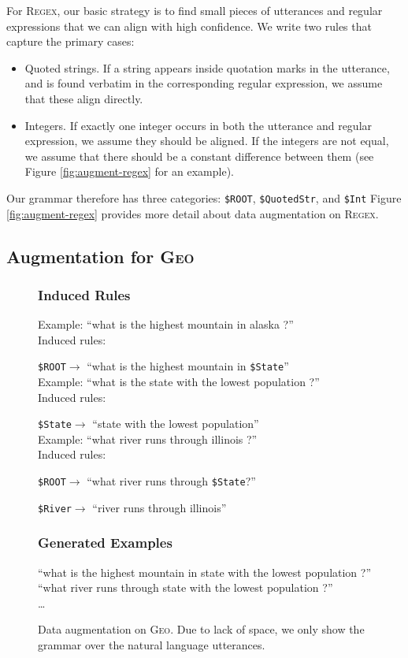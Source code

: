 \documentclass[11pt,letterpaper]{article}
\newcommand{\regex}{\textsc{Regex}\xspace}
\newcommand{\geo}{\textsc{Geo}\xspace}
\newcommand{\catroot}{\texttt{\$ROOT}\xspace}
\newcommand{\catstate}{\texttt{\$State}\xspace}
\newcommand{\catriver}{\texttt{\$River}\xspace}
\begin{document}
For \regex, our basic strategy is to find small pieces of 
utterances and regular expressions that we can align with high confidence.
We write two rules that capture the primary cases:
\begin{itemize}
  \item Quoted strings.  If a string appears inside quotation marks
    in the utterance, and is found verbatim in the corresponding
    regular expression, we assume that these align directly.
  \item Integers.  If exactly one integer occurs in both the 
    utterance and regular expression, we assume they should be aligned.
    If the integers are not equal, we assume that there should be
    a constant difference between them 
    (see Figure \ref{fig:augment-regex} for an example).
\end{itemize}

Our grammar therefore has three categories: 
\texttt{\$ROOT}, \texttt{\$QuotedStr}, and \texttt{\$Int}
Figure \ref{fig:augment-regex}
provides more detail about data augmentation on \regex.

\subsection{Augmentation for \geo}
\begin{figure}[t] 
\small
\begin{framed}
\footnotesize
\subsubsection*{Induced Rules}
Example: ``what is the highest mountain in alaska ?''\\
Induced rules:

\quad \catroot $\to$ ``what is the highest mountain in \catstate ''\\

Example: ``what is the state with the lowest population ?''\\
Induced rules:

\quad \catstate $\to$ ``state with the lowest population''\\

Example: ``what river runs through illinois ?''\\
Induced rules:

\quad \catroot $\to$ ``what river runs through \catstate ?''

\quad \catriver $\to$ ``river runs through illinois''

\subsubsection*{Generated Examples} 
``what is the highest mountain in state with the lowest population ?'' \\
``what river runs through state with the lowest population ?'' \\
\dots
\end{framed}
\caption{Data augmentation on \geo.  Due to lack of space,
we only show the grammar over the natural language utterances.}
\label{fig:augment-geo}
\end{figure}
\end{document}
